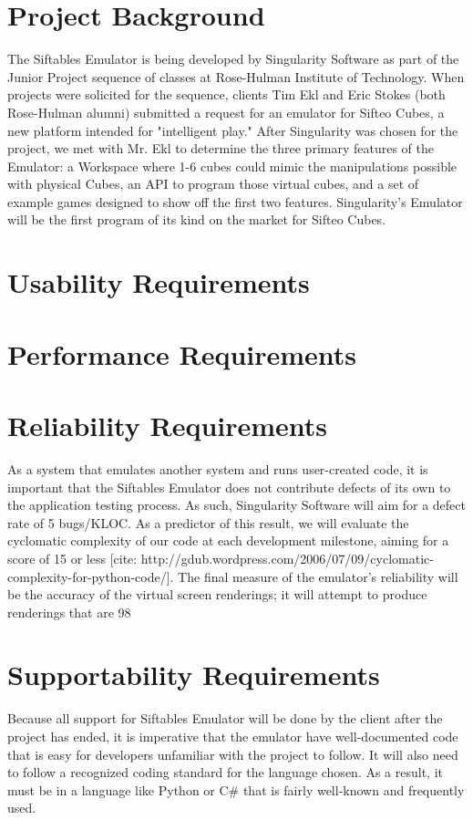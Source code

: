 \documentclass[12pt]{article}
\begin{document}
\section{Project Background}
The Siftables Emulator is being developed by Singularity Software as part of the Junior Project sequence of classes at Rose-Hulman Institute of Technology. When projects were solicited for the sequence, clients Tim Ekl and Eric Stokes (both Rose-Hulman alumni) submitted a request for an emulator for Sifteo Cubes, a new platform intended for "intelligent play." After Singularity was chosen for the project, we met with Mr. Ekl to determine the three primary features of the Emulator: a Workspace where 1-6 cubes could mimic the manipulations possible with physical Cubes, an \gls{API} to program those virtual cubes, and a set of example games designed to show off the first two features. Singularity's Emulator will be the first program of its kind on the market for Sifteo Cubes.


\section{Usability Requirements}



\section{Performance Requirements}



\section{Reliability Requirements}
As a system that emulates another system and runs user-created code, it is important that the Siftables Emulator does not contribute defects of its own to the application testing process. As such, Singularity Software will aim for a defect rate of 5 bugs/KLOC. As a predictor of this result, we will evaluate the cyclomatic complexity of our code at each development milestone, aiming for a score of 15 or less [cite: http://gdub.wordpress.com/2006/07/09/cyclomatic-complexity-for-python-code/]. The final measure of the emulator's reliability will be the accuracy of the virtual screen renderings; it will attempt to produce renderings that are 98%


\section{Supportability Requirements}
Because all support for Siftables Emulator will be done by the client after the project has ended, it is imperative that the emulator have well-documented code that is easy for developers unfamiliar with the project to follow. It will also need to follow a recognized coding standard for the language chosen. As a result, it must be in a language like Python or C\# that is fairly well-known and frequently used.
\end{document}
